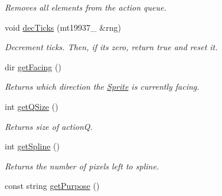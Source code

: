 \begin{DoxyCompactItemize}
\begin{DoxyCompactList}\small\item\em Removes all elements from the action queue. \end{DoxyCompactList}\item 
void \hyperlink{class_sprite_a8f06e4e0ea4c640c0d9685a1bf53452b}{dec\+Ticks} (mt19937\+\_ \&rng)\hypertarget{class_sprite_a8f06e4e0ea4c640c0d9685a1bf53452b}{}\label{class_sprite_a8f06e4e0ea4c640c0d9685a1bf53452b}

\begin{DoxyCompactList}\small\item\em Decrement ticks. Then, if it\textquotesingle{}s zero, return true and reset it. \end{DoxyCompactList}\item 
dir \hyperlink{class_sprite_a6bf9e87449da385e99c02586eadf5de6}{get\+Facing} ()\hypertarget{class_sprite_a6bf9e87449da385e99c02586eadf5de6}{}\label{class_sprite_a6bf9e87449da385e99c02586eadf5de6}

\begin{DoxyCompactList}\small\item\em Returns which direction the \hyperlink{class_sprite}{Sprite} is currently facing. \end{DoxyCompactList}\item 
int \hyperlink{class_sprite_aba8300207039d52feba12bafbe89f6df}{get\+Q\+Size} ()\hypertarget{class_sprite_aba8300207039d52feba12bafbe89f6df}{}\label{class_sprite_aba8300207039d52feba12bafbe89f6df}

\begin{DoxyCompactList}\small\item\em Returns size of actionQ. \end{DoxyCompactList}\item 
int \hyperlink{class_sprite_aad5e5beb45ec5eae6fe8d096d5ebef68}{get\+Spline} ()\hypertarget{class_sprite_aad5e5beb45ec5eae6fe8d096d5ebef68}{}\label{class_sprite_aad5e5beb45ec5eae6fe8d096d5ebef68}

\begin{DoxyCompactList}\small\item\em Returns the number of pixels left to spline. \end{DoxyCompactList}\item 
const string \hyperlink{class_sprite_ab130d27f349a15e736e2f60c9a20ca0d}{get\+Purpose} ()\hypertarget{class_sprite_ab130d27f349a15e736e2f60c9a20ca0d}{}\label{class_sprite_ab130d27f349a15e736e2f60c9a20ca0d}


\end{DoxyCompactItemize}
